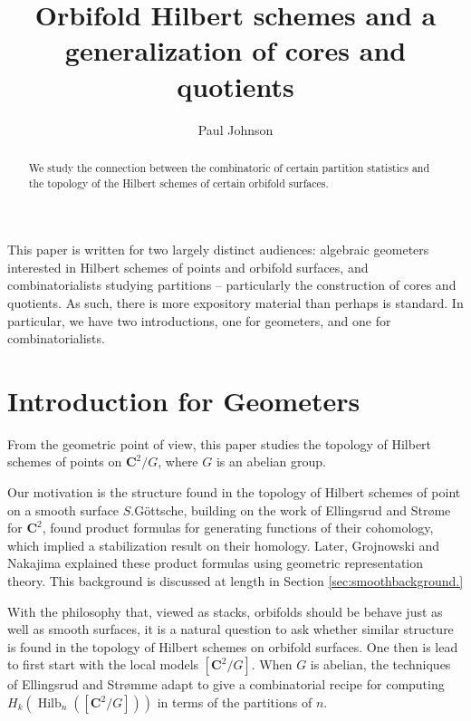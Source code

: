 \documentclass{amsart}[12pt]
\theoremstyle{definition}
\newcommand{\C}{\mathbf{C}}
\DeclareMathOperator{\Hilb}{Hilb}
\begin{document}
\begin{abstract}
We study the connection between the combinatoric of certain partition statistics and the topology of the Hilbert schemes of certain orbifold surfaces.
\end{abstract}


\title{Orbifold Hilbert schemes and a generalization of cores and quotients}


\author{Paul Johnson}
\address{University of Sheffield}


\maketitle
\setcounter{tocdepth}{1}
\tableofcontents
This paper is written for two largely distinct audiences: algebraic geometers interested in Hilbert schemes of points and orbifold surfaces, and combinatorialists studying partitions -- particularly the construction of cores and quotients.  As such, there is more expository material than perhaps is standard.  In particular, we have two introductions, one for geometers, and one for combinatorialists.


\section{Introduction for Geometers}
From the geometric point of view, this paper studies the topology of Hilbert schemes of points on $\C^2/G$, where $G$ is an abelian group.  

Our motivation is the structure found in the topology of Hilbert schemes of point on a smooth surface $S$.G\"ottsche, building on the work of Ellingsrud and Str\o me for $\C^2$, found product formulas for generating functions of their cohomology, which implied a stabilization result on their homology.  Later, Grojnowski and Nakajima \cite{grojnowski, nakajimaheisenberg} explained these product formulas using geometric representation theory.  This background is discussed at length in Section \ref{sec:smoothbackground.}

With the philosophy that, viewed as stacks, orbifolds should be behave just as well as smooth surfaces, it is a natural question to ask whether similar structure is found in the topology of Hilbert schemes on orbifold surfaces.  One then is lead to first start with the local models $[\C^2/G]$.  When $G$ is abelian, the techniques of Ellingsrud and Str\o mme adapt to give a combinatorial recipe for computing $H_k(\Hilb_n([\C^2/G]))$ in terms of the partitions of $n$.
\end{document}
